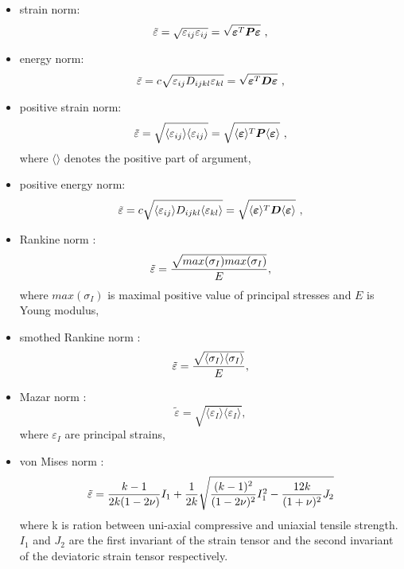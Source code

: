 \begin {itemize}
\item{
strain norm:
\begin{equation}\label{eqnorstrain}
\tilde{\varepsilon} = \sqrt{\varepsilon_{ij}\varepsilon_{ij}} =
\sqrt{\mbox{\boldmath$\varepsilon$}^T \mbox{\boldmath$P$} \mbox{\boldmath$\varepsilon$}}\ ,
\end{equation}
}
\item{
energy norm:
\begin{equation}\label{eqnorenergy}
\tilde{\varepsilon} = c\sqrt{\varepsilon_{ij} D_{ijkl} \varepsilon_{kl}} =
\sqrt{\mbox{\boldmath$\varepsilon$}^T \mbox{\boldmath$D$} \mbox{\boldmath$\varepsilon$}}\ ,
\end{equation}
}
\item{
positive strain norm:
\begin{equation}\label{eqnorposstrain}
\tilde{\varepsilon} = \sqrt{\langle\varepsilon_{ij}\rangle\langle\varepsilon_{ij}\rangle} =
\sqrt{\langle\mbox{\boldmath$\varepsilon$}\rangle^T \mbox{\boldmath$P$} \langle\mbox{\boldmath$\varepsilon$}\rangle}\ ,
\end{equation}
where $\langle \rangle$ denotes the positive part of argument,
}
\item{
positive energy norm:
\begin{equation}\label{eqnorposenergy}
\tilde{\varepsilon} = c\sqrt{\langle\varepsilon_{ij}\rangle D_{ijkl} \langle\varepsilon_{kl}\rangle} =
\sqrt{\langle\mbox{\boldmath$\varepsilon$}\rangle^T \mbox{\boldmath$D$} \langle\mbox{\boldmath$\varepsilon$}\rangle}\ ,
\end{equation}
}
\item{
Rankine norm :
\begin{equation}\label{eqnorrankine}
\tilde{\varepsilon}=\mbox{$\displaystyle\frac{\sqrt{max(\sigma_I) max(\sigma_I)}}{E}$},
\end{equation}
where $max(\sigma_I)$ is maximal positive value of principal stresses and $E$ is Young modulus,
}
\item{
smothed Rankine norm :
\begin{equation}\label{eqnorrankinesmooth}
\tilde{\varepsilon} = \mbox{$\displaystyle\frac{\sqrt{\langle\sigma_I\rangle\langle\sigma_I\rangle}}{E}$},
\end{equation}
}
\item{
Mazar norm :
\begin{equation}\label{eqnormazar}
\tilde{\varepsilon} = \sqrt{\langle\varepsilon_I\rangle \langle\varepsilon_I\rangle},
\end{equation}
where $\varepsilon_I$ are principal strains,
}
\item{
von Mises norm :
\begin{equation}\label{eqnorvonmises}
\tilde{\varepsilon} = \mbox{$\displaystyle\frac{k-1}{2k(1-2\nu)}$}I_1+\mbox{$\displaystyle\frac{1}{2k}$}\sqrt{\mbox{$\displaystyle\frac{(k-1)^2}{(1-2\nu)^2}$}I_1^2 - \mbox{$\displaystyle\frac{12k}{(1+\nu)^2}$}J_2}
\end{equation}
where k is ration between uni-axial compressive and uniaxial tensile strength. $I_1$ and $J_2$ are the first invariant of
the strain tensor and the second invariant of the deviatoric strain tensor respectively.
}
\end {itemize}


